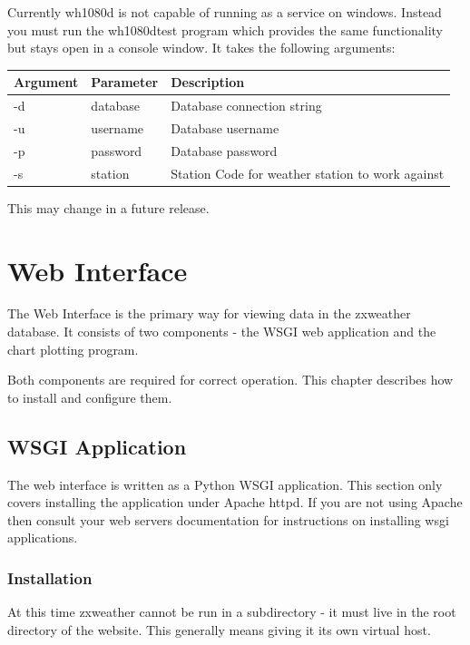 \documentclass[a4paper,10pt,draft]{book}
\begin{document}

Currently wh1080d is not capable of running as a service on windows. Instead you must run the wh1080dtest program which provides the same functionality but stays open in a console window. It takes the following arguments:

\begin{tabular}{l l p{10cm}}
\hline
\textbf{Argument} & \textbf{Parameter} & \textbf{Description} \\
\hline
-d & database & Database connection string \\
-u & username & Database username \\
-p & password & Database password \\
-s & station  & Station Code for weather station to work against \\
\hline
\end{tabular}

This may change in a future release.

\chapter{Web Interface}
\label{cha_web_interface}

The Web Interface is the primary way for viewing data in the zxweather database. It consists of two components - the WSGI web application and the chart plotting program.

Both components are required for correct operation. This chapter describes how to install and configure them.


\section{WSGI Application}

The web interface is written as a Python WSGI application. This section only covers installing the application under Apache httpd. If you are not using Apache then consult your web servers documentation for instructions on installing wsgi applications.

\subsection{Installation}

At this time zxweather cannot be run in a subdirectory - it must live in the root directory of the website. This generally means giving it its own virtual host.
\end{document}
